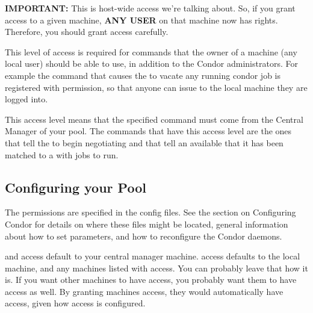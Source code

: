 \begin{description}
   \textbf{IMPORTANT:} This is host-wide access we're talking about.
   So, if you grant  access to a given machine,
   \textbf{ANY USER} on that machine now has 
   rights.  Therefore, you should grant  access
   carefully.

\item[\DCPerm{OWNER}] \label{dcperm:owner} This level of access is
   required for commands that the owner of a machine (any local user)
   should be able to use, in addition to the Condor administrators.
   For example the  command that causes the
    to vacate any running condor job is registered with
    permission, so that anyone can issue 
   to the local machine they are logged into.

\item[\DCPerm{NEGOTIATOR}] \label{dcperm:negotiator} This 
   access level means that the specified command must come from the
   Central Manager of your pool.  The commands that have this access
   level are the ones that tell the  to begin
   negotiating and that tell an available  that it has
   been matched to a  with jobs to run.

\end{description}

\subsection{\label{sec:Config-DCPerms}Configuring your Pool}

The permissions are specified in the config files.  See the
section on Configuring Condor for details on where these files might
be located, general information about how to set parameters, and how
to reconfigure the Condor daemons.

 and  access default to 
your central manager machine.
 access defaults to the local machine, and any machines
listed with  access.  You can probably leave
that how it is.  If you want other machines to have 
access, you probably want them to have  access
as well.  By granting machines  access, they
would automatically have  access, given how
 access is configured.

